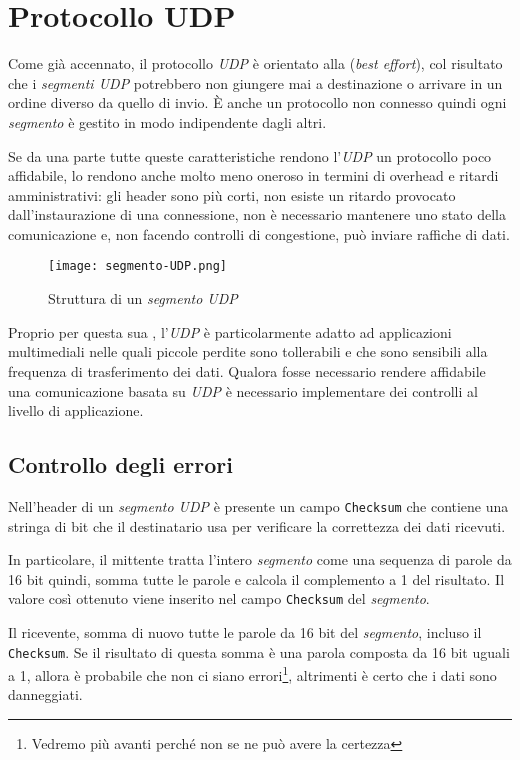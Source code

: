 \section{Protocollo UDP}
Come già accennato, il protocollo \emph{UDP} è orientato alla  (\emph{best effort}), col risultato che i \emph{segmenti UDP}
potrebbero non giungere mai a destinazione o arrivare in un ordine diverso da
quello di invio. È anche un protocollo non connesso quindi ogni \emph{segmento}
è gestito in modo indipendente dagli altri.

Se da una parte tutte queste caratteristiche rendono l'\emph{UDP} un protocollo
poco affidabile, lo rendono anche molto meno oneroso in termini di overhead e
ritardi amministrativi: gli header sono più corti, non esiste un ritardo
provocato dall'instaurazione di una connessione, non è necessario mantenere uno
stato della comunicazione e, non facendo controlli di congestione, può inviare
raffiche di dati.

\begin{figure}[h!]
    \centering
    \hspace{-2cm}
    \texttt{[image: segmento-UDP.png]}
    \caption{Struttura di un \emph{segmento UDP}}
\end{figure}\noindent
Proprio per questa sua , l'\emph{UDP} è particolarmente
adatto ad applicazioni multimediali nelle quali piccole perdite sono
tollerabili e che sono sensibili alla frequenza di trasferimento dei dati.
Qualora fosse necessario rendere affidabile una comunicazione basata su
\emph{UDP} è necessario implementare dei controlli al livello di applicazione.

\subsection{Controllo degli errori}
Nell'header di un \emph{segmento UDP} è presente un campo \texttt{Checksum}
che contiene una stringa di bit che il destinatario usa per verificare la
correttezza dei dati ricevuti.

In particolare, il mittente tratta l'intero \emph{segmento} come una sequenza
di parole da 16 bit quindi, somma tutte le parole e calcola il complemento a 1
del risultato. Il valore così ottenuto viene inserito nel campo \texttt{Checksum}
del \emph{segmento}.

Il ricevente, somma di nuovo tutte le parole da 16 bit del \emph{segmento}, incluso
il \texttt{Checksum}. Se il risultato di questa somma è una parola composta da
16 bit uguali a 1, allora è probabile che non ci siano errori\footnote{Vedremo
più avanti perché non se ne può avere la certezza}, altrimenti è certo che i
dati sono danneggiati.

